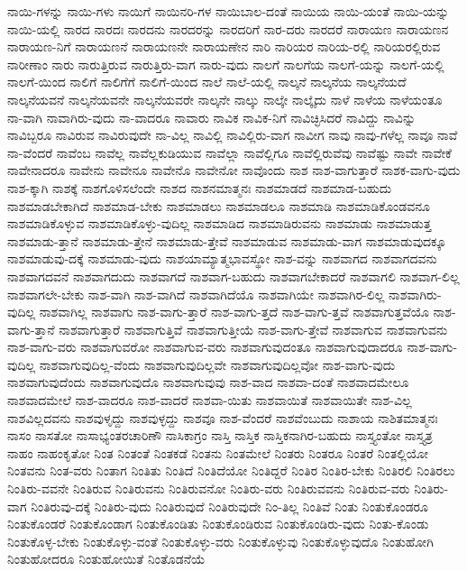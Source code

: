 {ನಾಯಿ-ಗಳನ್ನು
ನಾಯಿ-ಗಳು
ನಾಯಿಗೆ
ನಾಯಿನರಿ-ಗಳ
ನಾಯಿಬಾಲ-ದಂತೆ
ನಾಯಿಯ
ನಾಯಿ-ಯಂತೆ
ನಾಯಿ-ಯನ್ನು
ನಾಯಿ-ಯಲ್ಲಿ
ನಾರದ
ನಾರದಃ
ನಾರದನು
ನಾರದರನ್ನು
ನಾರದರಿಗೆ
ನಾರ-ದರು
ನಾರದರೆ
ನಾರಾಯಣ
ನಾರಾಯಣನ
ನಾರಾಯಣ-ನಿಗೆ
ನಾರಾಯಣನೆ
ನಾರಾಯಣನೇ
ನಾರಾಯಣೇನ
ನಾರಿ
ನಾರಿಯರ
ನಾರಿಯ-ರಲ್ಲಿ
ನಾರಿಯರಲ್ಲಿರುವ
ನಾರೀಣಾಂ
ನಾರು
ನಾರುತ್ತಿರುವ
ನಾರುತ್ತಿರು-ವಾಗ
ನಾರು-ವುದು
ನಾಲಗೆ
ನಾಲಗೆಯ
ನಾಲಗೆ-ಯನ್ನು
ನಾಲಗೆ-ಯಲ್ಲಿ
ನಾಲಗೆ-ಯಿಂದ
ನಾಲಿಗೆ
ನಾಲಿಗೆಗೆ
ನಾಲಿಗೆ-ಯಿಂದ
ನಾಲೆ
ನಾಲೆ-ಯಲ್ಲಿ
ನಾಲ್ಕನೆ
ನಾಲ್ಕನೆಯ
ನಾಲ್ಕನೆಯದೆ
ನಾಲ್ಕನೆಯವನೆ
ನಾಲ್ಕನೆಯವನೇ
ನಾಲ್ಕನೆಯವರೇ
ನಾಲ್ಕನೇ
ನಾಲ್ಕು
ನಾಲ್ಕೇ
ನಾಲ್ಕೈದು
ನಾಳೆ
ನಾಳೆಯ
ನಾಳೆಯಂತೂ
ನಾ-ವಾಗಿ
ನಾವಾಗಿರು-ವುದು
ನಾ-ವಾದರೂ
ನಾವಾರು
ನಾವಿಕ
ನಾವಿಕ-ನಿಗೆ
ನಾವಿಚ್ಛಿಸಿದರೆ
ನಾವಿದ್ದು
ನಾವಿನ್ನು
ನಾವಿಬ್ಬರೂ
ನಾವಿರುವ
ನಾವಿರುವುದೇ
ನಾ-ವಿಲ್ಲ
ನಾವಿಲ್ಲಿ
ನಾವಿಲ್ಲಿರು-ವಾಗ
ನಾವೀಗ
ನಾವು
ನಾವು-ಗಳೆಲ್ಲ
ನಾವೂ
ನಾವೆ
ನಾ-ವೆಂದರೆ
ನಾವೆಂಬ
ನಾವೆಲ್ಲ
ನಾವೆಲ್ಲಕುಡಿಯುವ
ನಾವೆಲ್ಲಾ
ನಾವೆಲ್ಲಿಗೂ
ನಾವೆಲ್ಲಿರುವೆವು
ನಾವೆಷ್ಟು
ನಾವೇ
ನಾವೇಕೆ
ನಾವೇನಾದರೂ
ನಾವೇನು
ನಾವೇನೂ
ನಾವೇನೊ
ನಾವೇನೋ
ನಾವೊಂದು
ನಾಶ
ನಾಶ-ವಾಗುತ್ತಾರೆ
ನಾಶಕ-ವಾಗು-ವುದು
ನಾಶ-ಕ್ಕಾಗಿ
ನಾಶಕ್ಕೆ
ನಾಶಗೊಳಿಸಲೆಂದೇ
ನಾಶದ
ನಾಶನಮಾತ್ಮನಃ
ನಾಶಮಾಡದೆ
ನಾಶಮಾಡ-ಬಹುದು
ನಾಶಮಾಡಬೇಕಾಗಿದೆ
ನಾಶಮಾಡ-ಬೇಕು
ನಾಶಮಾಡಲು
ನಾಶಮಾಡಲೂ
ನಾಶಮಾಡಿ
ನಾಶಮಾಡಿಕೊಂಡವನೂ
ನಾಶಮಾಡಿಕೊಳ್ಳುವ
ನಾಶಮಾಡಿಕೊಳ್ಳು-ವುದಿಲ್ಲ
ನಾಶಮಾಡಿದ
ನಾಶಮಾಡಿರುವನು
ನಾಶಮಾಡು
ನಾಶಮಾಡುತ್ತ
ನಾಶಮಾಡು-ತ್ತಾನೆ
ನಾಶಮಾಡು-ತ್ತೇನೆ
ನಾಶಮಾಡು-ತ್ತೇವೆ
ನಾಶಮಾಡುವ
ನಾಶಮಾಡು-ವಾಗ
ನಾಶಮಾಡುವುದಕ್ಕೂ
ನಾಶಮಾಡುವು-ದಕ್ಕೆ
ನಾಶಮಾಡು-ವುದು
ನಾಶಯಾಮ್ಯಾತ್ಮಭಾವಸ್ಥೋ
ನಾಶ-ವನ್ನು
ನಾಶವಾಗದ
ನಾಶವಾಗದವನು
ನಾಶವಾಗದವನೆ
ನಾಶವಾಗದುದು
ನಾಶವಾಗದೆ
ನಾಶವಾಗ-ಬಹುದು
ನಾಶವಾಗಬೇಕಾದರೆ
ನಾಶವಾಗಲಿ
ನಾಶವಾಗ-ಲಿಲ್ಲ
ನಾಶವಾಗಲೇ-ಬೇಕು
ನಾಶ-ವಾಗಿ
ನಾಶ-ವಾಗಿದೆ
ನಾಶವಾಗಿದೆಯೊ
ನಾಶವಾಗಿಯೇ
ನಾಶವಾಗಿರ-ಲಿಲ್ಲ
ನಾಶವಾಗಿರು-ವುದಿಲ್ಲ
ನಾಶವಾಗಿಲ್ಲ
ನಾಶವಾಗು
ನಾಶ-ವಾಗು-ತ್ತಾರೆ
ನಾಶ-ವಾಗು-ತ್ತದೆ
ನಾಶ-ವಾಗು-ತ್ತವೆ
ನಾಶವಾಗುತ್ತವೆಯೊ
ನಾಶ-ವಾಗು-ತ್ತಾನೆ
ನಾಶವಾಗುತ್ತಾರೆ
ನಾಶವಾಗುತ್ತಿವೆ
ನಾಶವಾಗುತ್ತೀಯೆ
ನಾಶ-ವಾಗು-ತ್ತೇವೆ
ನಾಶವಾಗುವ
ನಾಶವಾಗುವನು
ನಾಶ-ವಾಗು-ವರು
ನಾಶವಾಗುವರೋ
ನಾಶವಾಗುವ-ವರು
ನಾಶವಾಗುವುದಂತೂ
ನಾಶವಾಗುವುದಾದರೂ
ನಾಶ-ವಾಗು-ವುದಿಲ್ಲ
ನಾಶವಾಗುವುದಿಲ್ಲ-ವೆಂದು
ನಾಶವಾಗುವುದಿಲ್ಲವೇ
ನಾಶವಾಗುವುದಿಲ್ಲವೋ
ನಾಶ-ವಾಗು-ವುದು
ನಾಶವಾಗುವುದೆಂದು
ನಾಶವಾಗುವುದೊ
ನಾಶವಾಗುವುವು
ನಾಶ-ವಾದ
ನಾಶವಾ-ದಂತೆ
ನಾಶವಾದಮೇಲೂ
ನಾಶವಾದಮೇಲೆ
ನಾಶ-ವಾದರೂ
ನಾಶ-ವಾದರೆ
ನಾಶವಾ-ಯಿತು
ನಾಶವಾಯಿತೆ
ನಾಶವಾಯಿತೇ
ನಾಶ-ವಿಲ್ಲ
ನಾಶವಿಲ್ಲದವನು
ನಾಶವುಳೃದ್ದು
ನಾಶವುಳ್ಳದ್ದು
ನಾಶವೂ
ನಾಶ-ವೆಂದರೆ
ನಾಶವೆಂಬುದು
ನಾಶಾಯ
ನಾಶಿತಮಾತ್ಮನಃ
ನಾಸಂ
ನಾಸತೋ
ನಾಸಾಭ್ಯಂತರಚಾರಿಣೌ
ನಾಸಿಕಾಗ್ರಂ
ನಾಸ್ತಿ
ನಾಸ್ತಿಕ
ನಾಸ್ತಿಕನಾಗಿರ-ಬಹುದು
ನಾಸ್ತ್ಯಂತೋ
ನಾಸ್ತ್ಯತ್ರ
ನಾಹಂ
ನಾಹಂಕೃತೋ
ನಿಂತ
ನಿಂತಂತೆ
ನಿಂತಕಡೆ
ನಿಂತನು
ನಿಂತಮೇಲೆ
ನಿಂತರು
ನಿಂತರೂ
ನಿಂತರೆ
ನಿಂತಲ್ಲಿಯೋ
ನಿಂತವನು
ನಿಂತ-ವರು
ನಿಂತಾಗ
ನಿಂತಿತು
ನಿಂತಿದೆ
ನಿಂತಿದೆಯೋ
ನಿಂತಿದ್ದರೆ
ನಿಂತಿರ
ನಿಂತಿರ-ಬೇಕು
ನಿಂತಿರಲಿ
ನಿಂತಿರಲು
ನಿಂತಿರು-ವವನೇ
ನಿಂತಿರುವ
ನಿಂತಿರುವನು
ನಿಂತಿರುವನೋ
ನಿಂತಿರು-ವರು
ನಿಂತಿರುವವನು
ನಿಂತಿರುವ-ವರು
ನಿಂತಿರು-ವಾಗ
ನಿಂತಿರುವು-ದಕ್ಕೆ
ನಿಂತಿರು-ವುದು
ನಿಂತಿರುವುದೆ
ನಿಂತಿರುವುದೇ
ನಿಂ-ತಿಲ್ಲ
ನಿಂತಿವೆ
ನಿಂತು
ನಿಂತುಕೊಂಡರೂ
ನಿಂತುಕೊಂಡರೆ
ನಿಂತುಕೊಂಡಾಗ
ನಿಂತುಕೊಂಡಿತು
ನಿಂತುಕೊಂಡಿರುವ
ನಿಂತುಕೊಂಡಿರು-ವುದು
ನಿಂತು-ಕೊಂಡು
ನಿಂತುಕೊಳ್ಳ-ಬೇಕು
ನಿಂತುಕೊಳ್ಳು-ವಂತೆ
ನಿಂತುಕೊಳ್ಳು-ವರು
ನಿಂತುಕೊಳ್ಳುವು
ನಿಂತುಕೊಳ್ಳುವುದೊ
ನಿಂತುಹೋಗಿ
ನಿಂತುಹೋದರೂ
ನಿಂತುಹೋಯಿತೆ
ನಿಂತೊಡನೆಯೆ
}
